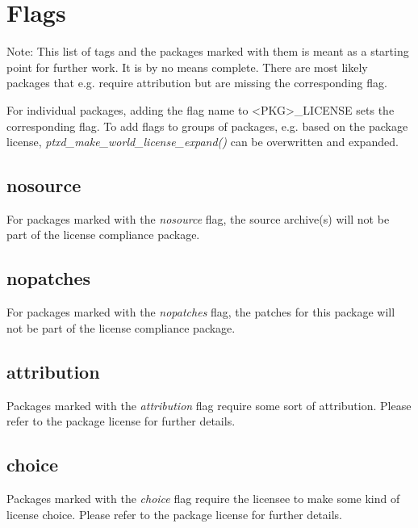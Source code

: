 \appendix
\chapter{Flags\label{Flags}}
Note: This list of tags and the packages marked with them is meant
as a starting point for further work. It is by no means complete.
There are most likely packages that e.g. require attribution but
are missing the corresponding flag.

For individual packages, adding the flag name to
\textless{}PKG\textgreater\_LICENSE
sets the corresponding flag. To add flags to groups of packages,
e.g. based on the package license,
\emph{ptxd\_make\_world\_license\_expand()} can be overwritten and
expanded.
\section{nosource\label{nosource}}
For packages marked with the {\it nosource} flag, the source
archive(s) will not be part of the license compliance package.
\section{nopatches\label{nopatches}}
For packages marked with the {\it nopatches} flag, the patches
for this package will not be part of the license compliance
package.
\section{attribution\label{attribution}}
Packages marked with the {\it attribution} flag require some sort
of attribution. Please refer to the package license for further
details.
\section{choice\label{choice}}
Packages marked with the {\it choice} flag require the licensee to
make some kind of license choice. Please refer to the package
license for further details.

\printindex[attribution]
\printindex[choice]
\printindex[nosource]
\printindex[nopatches]

\listoffigures


